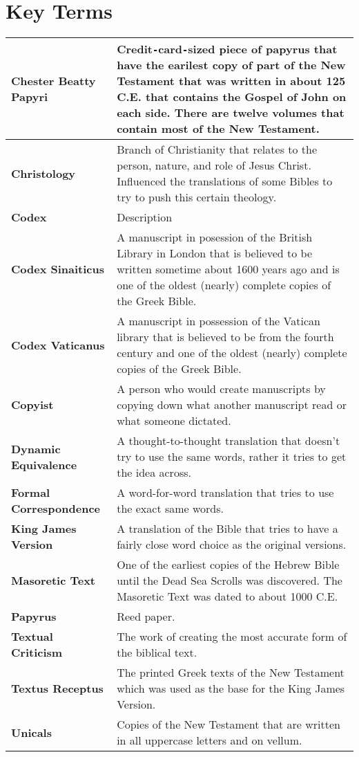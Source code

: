 \documentclass{report}
\begin{document}
        \section{Key Terms}
        \begin{center}
            \begin{longtable}{| p{5cm} | p{7cm} |}
                \hline
                \textbf{Chester Beatty Papyri} & Credit\texttt{-}card\texttt{-}sized piece of papyrus that have the earilest copy of part of the New Testament that was written in about 125 C.E. that contains the Gospel of John on each side. There are twelve volumes that contain most of the New Testament.\\ \hline
                \textbf{Christology} & Branch of Christianity that relates to the person, nature, and role of Jesus Christ. Influenced the translations of some Bibles to try to push this certain theology.\\ \hline
                \textbf{Codex} & Description \\ \hline
                \textbf{Codex Sinaiticus} & A manuscript in posession of the British Library in London that is believed to be written sometime about 1600 years ago and is one of the oldest (nearly) complete copies of the Greek Bible.\\ \hline 
                \textbf{Codex Vaticanus} & A manuscript in possession of the Vatican library that is believed to be from the fourth century and one of the oldest (nearly) complete copies of the Greek Bible.\\ \hline
                \textbf{Copyist} & A person who would create manuscripts by copying down what another manuscript read or what someone dictated.\\ \hline
                \textbf{Dynamic Equivalence} & A thought-to-thought translation that doesn't try to use the same words, rather it tries to get the idea across.\\ \hline
                \textbf{Formal Correspondence} & A word-for-word translation that tries to use the exact same words.\\ \hline
                \textbf{King James Version} & A translation of the Bible that tries to have a fairly close word choice as the original versions.\\ \hline
                \textbf{Masoretic Text} & One of the earliest copies of the Hebrew Bible until the Dead Sea Scrolls was discovered. The Masoretic Text was dated to about 1000 C.E.\\ \hline
                \textbf{Papyrus} & Reed paper.\\ \hline
                \textbf{Textual Criticism} & The work of creating the most accurate form of the biblical text.\\ \hline
                \textbf{Textus Receptus} & The printed Greek texts of the New Testament which was used as the base for the King James Version.\\ \hline
                \textbf{Unicals} & Copies of the New Testament that are written in all uppercase letters and on vellum.\\ \hline
            \end{longtable}
        \end{center}
\end{document}

